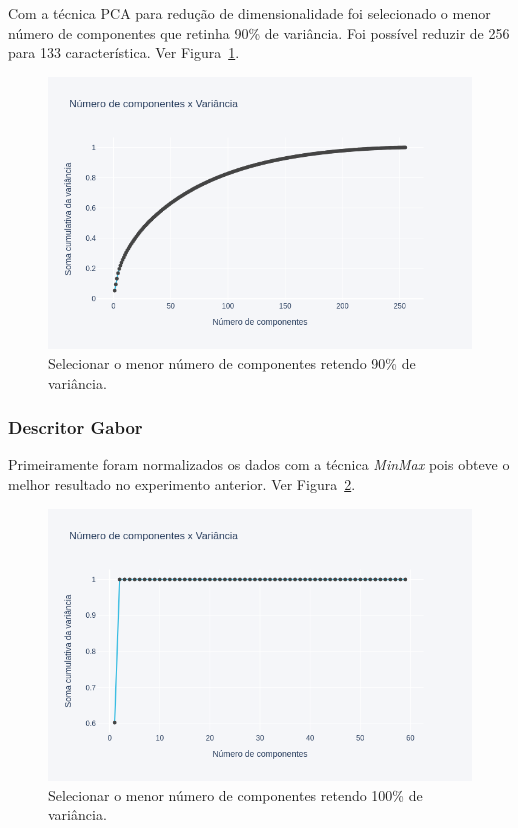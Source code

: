 Com a técnica PCA para redução de dimensionalidade foi selecionado o menor número de componentes que retinha 90\% de variância. Foi possível reduzir de 256 para 133 característica. Ver Figura~\ref{fig:points_pca_lbp}. 

\begin{figure}[!htbp]
	\centering
	\includegraphics[width=1.0\linewidth,clip=true,trim=0cm 0cm 0cm 0cm, keepaspectratio=true]{points_pca_lbp.png}
	\caption{Selecionar o menor número de componentes retendo 90\% de variância.}
	\label{fig:points_pca_lbp}
\end{figure}

\subsubsection{Descritor Gabor}
Primeiramente foram normalizados os dados com a técnica \textit{MinMax} pois obteve o melhor resultado no experimento anterior. Ver Figura~\ref{fig:points_pca_gabor}.

\begin{figure}[!htbp]
	\centering
	\includegraphics[width=1.0\linewidth,clip=true,trim=0cm 0cm 0cm 0cm, keepaspectratio=true]{points_pca_gabor.png}
	\caption{Selecionar o menor número de componentes retendo 100\% de variância.}
	\label{fig:points_pca_gabor}
\end{figure}

